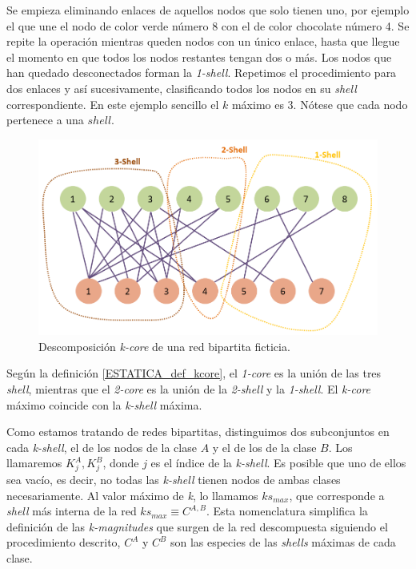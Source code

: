 Se empieza eliminando enlaces de aquellos nodos que solo tienen uno, por ejemplo el que une el nodo de color verde número 8 con el de color chocolate número 4. Se repite la operación mientras queden nodos con un único enlace, hasta que llegue el momento en que todos los nodos restantes tengan dos o más. Los nodos que han quedado desconectados forman la \textit{1-shell}. Repetimos el procedimiento para dos enlaces y así sucesivamente, clasificando todos los nodos en su \textit{shell} correspondiente. En este ejemplo sencillo el $k$ máximo es 3. Nótese que cada nodo pertenece a una $shell$.

\begin{figure}[h!]
\centering
\includegraphics[scale=0.55]{Figures/ESTATICA_kcore_decomposition_example.png}
\caption{Descomposición \textit{k-core} de una red bipartita ficticia.}
\label{fig:ESTATICA_kcore_decomposition_example}
\end{figure}

Según la definición \ref{ESTATICA_def_kcore}, el  \textit{1-core} es la unión de las tres \textit{shell}, mientras que el \textit{2-core} es la unión de la \textit{2-shell} y la \textit{1-shell}. El \textit{k-core} máximo coincide con la  \textit{k-shell} máxima. 

Como estamos tratando de redes bipartitas, distinguimos dos subconjuntos en cada \textit{k-shell}, el de los nodos de la clase $A$ y el de los de la clase $B$. Los llamaremos $K^{A}_{j}, K^{B}_{j}$, donde  $j$ es el índice de la \textit{k-shell}.
Es posible que uno de ellos sea vacío, es decir, no todas las \textit{k-shell} tienen nodos de ambas clases necesariamente.
Al valor máximo de \textit{k}, lo llamamos $ks_{max}$, que corresponde a \textit{shell} más interna de la red $ks_{max}\equiv C^{A,B}$. Esta nomenclatura simplifica la definición de las \textit{k-magnitudes} que surgen de la red descompuesta siguiendo el procedimiento descrito, $C^A$ y $C^B$ son las especies de las \textit{shells} máximas de cada clase.


